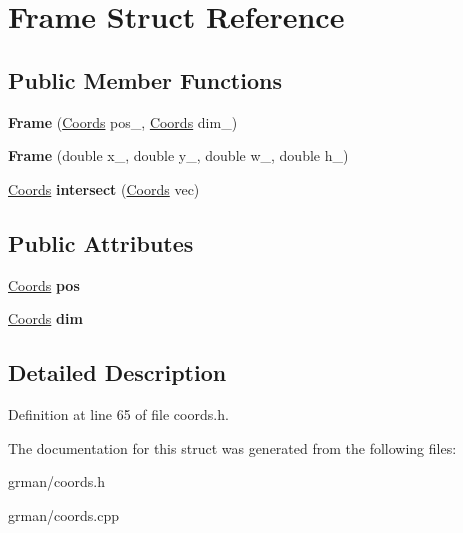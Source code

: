 \hypertarget{struct_frame}{}\section{Frame Struct Reference}
\label{struct_frame}
\subsection*{Public Member Functions}
\begin{DoxyCompactItemize}
\item 
\mbox{\label{struct_frame_a25abfa03084fb3433d8a31b5ce4b3e03}} 
{\bfseries Frame} (\mbox{\hyperlink{struct_coords}{Coords}} pos\+\_\+, \mbox{\hyperlink{struct_coords}{Coords}} dim\+\_\+)
\item 
\mbox{\label{struct_frame_a69bd3486fc68c03e42b7692ee62c36a7}} 
{\bfseries Frame} (double x\+\_\+, double y\+\_\+, double w\+\_\+, double h\+\_\+)
\item 
\mbox{\label{struct_frame_aa53a6d89610817455b7eca80202482e7}} 
\mbox{\hyperlink{struct_coords}{Coords}} {\bfseries intersect} (\mbox{\hyperlink{struct_coords}{Coords}} vec)
\end{DoxyCompactItemize}
\subsection*{Public Attributes}
\begin{DoxyCompactItemize}
\item 
\mbox{\label{struct_frame_ab1623c15654af546fd697b30b1ee7f41}} 
\mbox{\hyperlink{struct_coords}{Coords}} {\bfseries pos}
\item 
\mbox{\label{struct_frame_a5f8b607848440beb3fda8bc7ae26f13e}} 
\mbox{\hyperlink{struct_coords}{Coords}} {\bfseries dim}
\end{DoxyCompactItemize}


\subsection{Detailed Description}


Definition at line 65 of file coords.\+h.



The documentation for this struct was generated from the following files\+:\begin{DoxyCompactItemize}
\item 
grman/coords.\+h\item 
grman/coords.\+cpp\end{DoxyCompactItemize}
